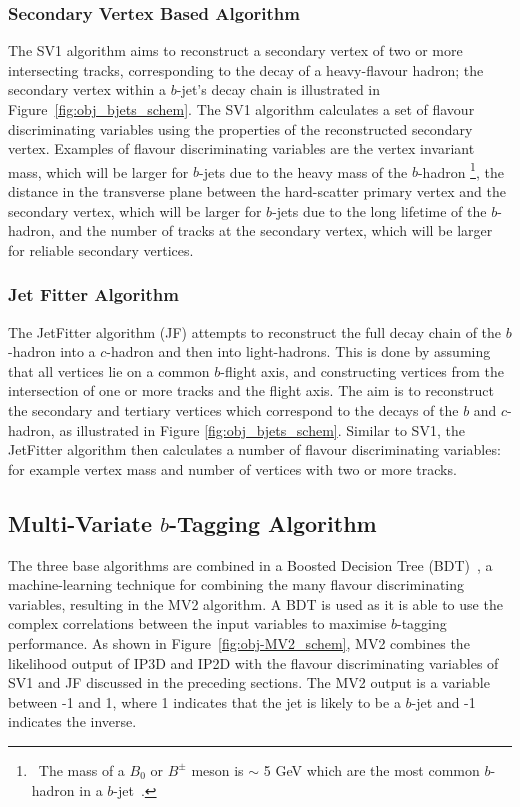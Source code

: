 \subsubsection{Secondary Vertex Based Algorithm}
\label{sec:obj-bjets_SV}

The SV1 algorithm aims to reconstruct a secondary vertex of two or more intersecting tracks, corresponding to the decay of a heavy-flavour hadron;
the secondary vertex within a $b$-jet's decay chain is illustrated in Figure~\ref{fig:obj_bjets_schem}.
The SV1 algorithm calculates a set of flavour discriminating variables using the properties of the reconstructed secondary vertex.
Examples of flavour discriminating variables are the vertex invariant mass,
which will be larger for $b$-jets due to the heavy mass of the $b$-hadron
\footnote{\ The mass of a $B_0$ or $B^\pm$ meson is $\sim$ 5 GeV which are the most common $b$-hadron in a $b$-jet~\cite{obj-bjets_PDG}.}, 
the distance in the transverse plane between the hard-scatter primary vertex and the secondary vertex, %
which will be larger for $b$-jets due to the long lifetime of the $b$-hadron,
and the number of tracks at the secondary vertex, which will be larger for reliable secondary vertices.

\subsubsection{Jet Fitter Algorithm}
\label{sec:obj-bjets_JF}

The JetFitter algorithm (JF) attempts to reconstruct the full decay chain of the $b$-hadron into a $c$-hadron and then into light-hadrons. 
This is done by assuming that all vertices lie on a common $b$-flight axis, and constructing vertices from the intersection of
one or more tracks and the flight axis.
The aim is to reconstruct the secondary and tertiary vertices which correspond to the decays of the $b$ and $c$-hadron,
as illustrated in Figure \ref{fig:obj_bjets_schem}.
Similar to SV1, the JetFitter algorithm then calculates a number of flavour discriminating variables:
for example vertex mass and number of vertices with two or more tracks.

\subsection{Multi-Variate $b$-Tagging Algorithm}
\label{sec:obj-bjets_MV2}

The three base algorithms are combined in a Boosted Decision Tree (BDT)~\cite{obj-bjets_bdt},
a machine-learning technique for combining the many flavour discriminating variables, resulting in the MV2 algorithm.
A BDT is used as it is able to use the complex correlations between the input variables to maximise $b$-tagging performance.
As shown in Figure~\ref{fig:obj-MV2_schem}, MV2 combines the likelihood output of IP3D and IP2D
with the flavour discriminating variables of SV1 and JF discussed in the preceding sections.
The MV2 output is a variable between -1 and 1, where 1 indicates that the jet is likely to be a $b$-jet and -1 indicates the inverse.

